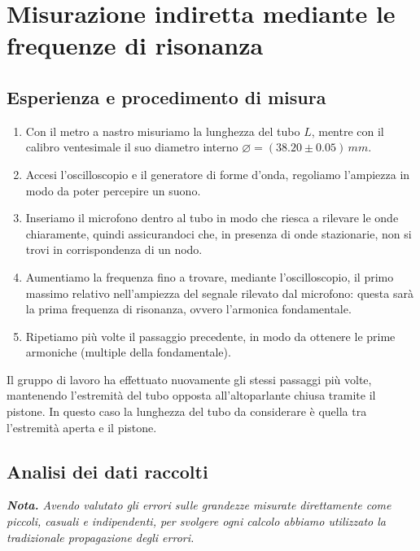 \documentclass{article}
\newcommand*{\diam}{\varnothing}
\begin{document}
\pagebreak
\section{Misurazione indiretta mediante le frequenze di risonanza}

\subsection{Esperienza e procedimento di misura}

\begin{enumerate}
  \item
    Con il metro a nastro misuriamo la lunghezza del tubo $L$,
    mentre con il calibro ventesimale il suo diametro interno
    $\diam=(38.20\pm0.05)\,\unit{mm}$.
  \item
    Accesi l'oscilloscopio e il generatore di forme d'onda,
    regoliamo l'ampiezza in modo da poter percepire un suono.
  \item
    Inseriamo il microfono dentro al tubo in modo che riesca a rilevare le onde
    chiaramente, quindi assicurandoci che, in presenza di onde stazionarie,
    non si trovi in corrispondenza di un nodo.
  \item
    Aumentiamo la frequenza fino a trovare, mediante l'oscilloscopio,
    il primo massimo relativo nell'ampiezza del segnale rilevato dal
    microfono: questa sarà la prima frequenza di risonanza,
    ovvero l'armonica fondamentale.
  \item
    Ripetiamo più volte il passaggio precedente, in modo da ottenere le prime
    armoniche (multiple della fondamentale).
\end{enumerate}
Il gruppo di lavoro ha effettuato nuovamente gli stessi passaggi più volte,
mantenendo l'estremità del tubo opposta all'altoparlante chiusa tramite il pistone.
In questo caso la lunghezza del tubo da considerare è quella tra l'estremità
aperta e il pistone.

\subsection{Analisi dei dati raccolti}
\emph{\textbf{Nota.}
Avendo valutato gli errori sulle grandezze misurate direttamente
come piccoli, casuali e indipendenti, per svolgere ogni calcolo
abbiamo utilizzato la tradizionale propagazione degli errori.
}
\vspace{2mm}
\end{document}
